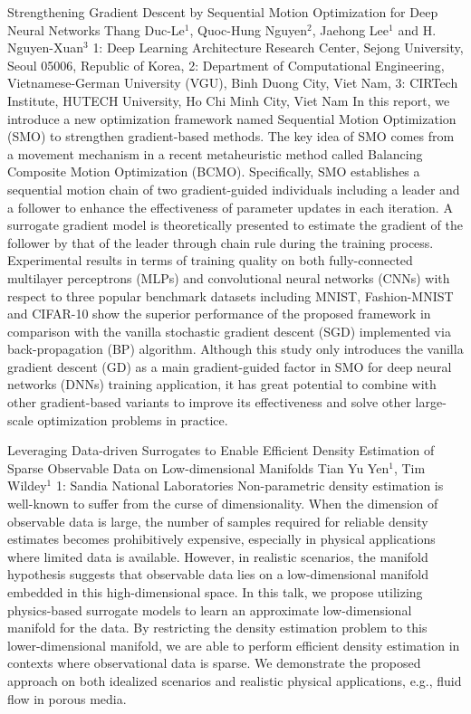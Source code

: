\begin{addmargin}[2em]{0em}
\vspace{1.5ex}
\abs
{Strengthening Gradient Descent by Sequential Motion Optimization for Deep Neural Networks}
{Thang Duc-Le$^{1}$, Quoc-Hung Nguyen$^{2}$, Jaehong Lee$^{1}$ and H. Nguyen-Xuan$^{3}$}
{1:  Deep Learning Architecture Research Center, Sejong University, Seoul 05006, Republic of Korea, 2: Department of Computational Engineering, Vietnamese-German University (VGU), Binh Duong City, Viet Nam, 3: CIRTech Institute, HUTECH University, Ho Chi Minh City, Viet Nam}
{In this report, we introduce a new optimization framework named Sequential Motion Optimization (SMO) to strengthen gradient-based methods. The key idea of SMO comes from a movement mechanism in a recent metaheuristic method called Balancing Composite Motion Optimization (BCMO). Specifically, SMO establishes a sequential motion chain of two gradient-guided individuals including a leader and a follower to enhance the effectiveness of parameter updates in each iteration. A surrogate gradient model is theoretically presented to estimate the gradient of the follower by that of the leader through chain rule during the training process. Experimental results in terms of training quality on both fully-connected multilayer perceptrons (MLPs) and convolutional neural networks (CNNs) with respect to three popular benchmark datasets including MNIST, Fashion-MNIST and CIFAR-10 show the superior performance of the proposed framework in comparison with the vanilla stochastic gradient descent (SGD) implemented via back-propagation (BP) algorithm. Although this study only introduces the vanilla gradient descent (GD) as a main gradient-guided factor in SMO for deep neural networks (DNNs) training application, it has great potential to combine with other gradient-based variants to improve its effectiveness and solve other large-scale optimization problems in practice.}


\vspace{1.5ex}
\abs
{Leveraging Data-driven Surrogates to Enable Efficient Density Estimation of Sparse Observable Data on Low-dimensional Manifolds}
{Tian Yu Yen$^1$, Tim Wildey$^1$}
{1: Sandia National Laboratories}
{Non-parametric density estimation is well-known to suffer from the curse of dimensionality. When the dimension of observable data is large, the number of samples required for reliable density estimates becomes prohibitively expensive, especially in physical applications where limited data is available. However, in realistic scenarios, the manifold hypothesis suggests that observable data lies on a low-dimensional manifold embedded in this high-dimensional space. In this talk, we propose utilizing physics-based surrogate models to learn an approximate low-dimensional manifold for the data. By restricting the density estimation problem to this lower-dimensional manifold, we are able to perform efficient density estimation in contexts where observational data is sparse. We demonstrate the proposed approach on both idealized scenarios and realistic physical applications, e.g., fluid flow in porous media.}



\end{addmargin}
